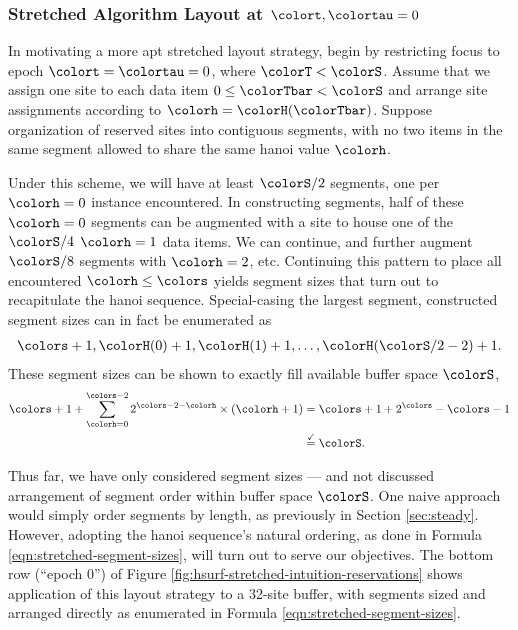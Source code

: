 \subsubsection{Stretched Algorithm Layout at $\colort,\colortau=0$}

In motivating a more apt stretched layout strategy, begin by restricting focus to epoch $\colort=\colortau=0$, where $\colorT < \colorS$.
Assume that we assign one site to each data item $0\leq \colorTbar < \colorS$ and arrange site assignments according to \hv{} $\colorh = \colorH(\colorTbar)$.
Suppose organization of reserved sites into contiguous segments, with no two items in the same segment allowed to share the same hanoi value $\colorh$.

Under this scheme, we will have at least $\colorS/2$ segments, one per \hv{} $\colorh=0$ instance encountered.
In constructing segments, half of these $\colorh=0$ segments can be augmented with a site to house one of the $\colorS/4$ \hv{} $\colorh=1$ data items.
We can continue, and further augment $\colorS/8$ segments with \hv{} $\colorh=2$, etc.
Continuing this pattern to place all encountered \hv{} $\colorh\leq\colors$ yields segment sizes that turn out to recapitulate the hanoi sequence.
Special-casing the largest segment, constructed segment sizes can in fact be enumerated as
\begin{align}
\colors + 1, \colorH(0) + 1, \colorH(1) + 1, \ldots, \colorH(\colorS/2 - 2) + 1.
\label{eqn:stretched-segment-sizes}
\end{align}
These segment sizes can be shown to exactly fill available buffer space $\colorS$,
\begin{align*}
\colors + 1
+  \sum_{\colorh = 0}^{\colors - 2}
2^{\colors - 2 - \colorh} \times (\colorh + 1)
&=
\colors + 1 +
2^{\colors} - \colors - 1\\
&\stackrel{\checkmark}{=}
\colorS.
\end{align*}

Thus far, we have only considered segment sizes --- and not discussed arrangement of segment order within buffer space $\colorS$.
One naive approach would simply order segments by length, as previously in Section \ref{sec:steady}.
However, adopting the hanoi sequence's natural ordering, as done in Formula \ref{eqn:stretched-segment-sizes}, will turn out to serve our objectives.
The bottom row (``epoch 0'') of Figure \ref{fig:hsurf-stretched-intuition-reservations} shows application of this layout strategy to a 32-site buffer, with segments sized and arranged directly as enumerated in Formula \ref{eqn:stretched-segment-sizes}.

